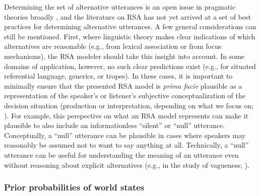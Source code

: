 \documentclass{sp}
\begin{document}
Determining the set of alternative utterances is an open issue in pragmatic theories broadly \citep{ChemlaSingh2014:Remarks-on-the-,Katzir2007:Structurally-De,FoxKatzir2011:On-the-Characte}, and the literature on RSA has not yet arrived at a set of best practices for determining alternative utterances.
A few general considerations can still be mentioned.
First, where linguistic theory makes clear indications of which alternatives are reasonable (e.g., from lexical association or from focus mechanisms), the RSA modeler should take this insight into account.
In some domains of application, however, no such clear predictions exist (e.g., for situated referential language, generics, or tropes).
In these cases, it is important to minimally ensure that the presented RSA model is \emph{prima facie} plausible as a representation of the speaker's or listener's subjective conceptualization of the decision situation (production or interpretation, depending on what we focus on; \citealp{Franke2012:Pragmatic-Reaso}).
For example, this perspective on what an RSA model represents can make it plausible to also include an informationless ``silent'' or ``null'' utterance.
Conceptually, a ``null'' utterance can be plausible in cases where speakers may reasonably be assumed not to want to say anything at all.
Technically, a ``null'' utterance can be useful for understanding the meaning of an utterance even without reasoning about explicit alternatives (e.g., in the study of vagueness; \citealp{lassitergoodman2013}).


\subsubsection{Prior probabilities of world states}
\end{document}
